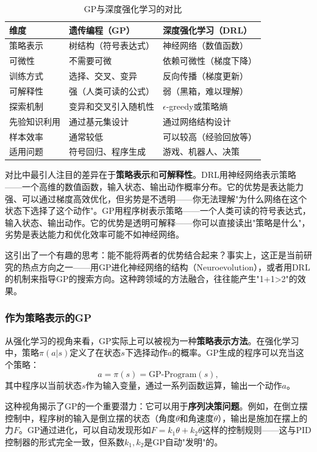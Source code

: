 \documentclass[lang=cn,zihao=-4,a4paper,fontset=windows]{beautybook}
\begin{document}
\begin{table}[H]
\centering
\caption{GP与深度强化学习的对比}
\begin{tabular}{p{}p{}p{}}
\toprule
\textbf{维度} & \textbf{遗传编程（GP）} & \textbf{深度强化学习（DRL）} \\
\midrule
策略表示 & 树结构（符号表达式） & 神经网络（数值函数） \\
\hline
可微性 & 不需要可微 & 依赖可微性（梯度下降） \\
\hline
训练方式 & 选择、交叉、变异 & 反向传播（梯度更新） \\
\hline
可解释性 & 强（人类可读的公式） & 弱（黑箱，难以理解） \\
\hline
探索机制 & 变异和交叉引入随机性 & $\epsilon$-greedy或策略熵 \\
\hline
先验知识利用 & 通过基元集设计 & 通过网络结构设计 \\
\hline
样本效率 & 通常较低 & 可以较高（经验回放等） \\
\hline
适用问题 & 符号回归、程序生成 & 游戏、机器人、决策 \\
\bottomrule
\end{tabular}
\end{table}

对比中最引人注目的差异在于\textbf{策略表示}和\textbf{可解释性}。DRL用神经网络表示策略——一个高维的数值函数，输入状态、输出动作概率分布。它的优势是表达能力强、可以通过梯度高效优化，但劣势是不透明——你无法理解"为什么网络在这个状态下选择了这个动作"。GP用程序树表示策略——一个人类可读的符号表达式，输入状态、输出动作。它的优势是透明可解释——你可以直接读出"策略是什么"，劣势是表达能力和优化效率可能不如神经网络。

这引出了一个有趣的思考：能不能将两者的优势结合起来？事实上，这正是当前研究的热点方向之一——用GP进化神经网络的结构（Neuroevolution），或者用DRL的机制来指导GP的搜索方向。这种跨领域的方法融合，往往能产生"1+1>2"的效果。

\subsubsection{作为策略表示的GP}

从强化学习的视角来看，GP实际上可以被视为一种\textbf{策略表示方法}。在强化学习中，策略$\pi(a|s)$定义了在状态$s$下选择动作$a$的概率。GP生成的程序可以充当这个策略：
\[
a = \pi(s) = \text{GP-Program}(s),
\]
其中程序以当前状态$s$作为输入变量，通过一系列函数运算，输出一个动作$a$。

这种视角揭示了GP的一个重要潜力：它可以用于\textbf{序列决策问题}。例如，在倒立摆控制中，程序树的输入是倒立摆的状态（角度$\theta$和角速度$\dot{\theta}$），输出是施加在摆上的力$F$。GP通过进化，可以自动发现形如$F = k_1 \theta + k_2 \dot{\theta}$这样的控制规则——这与PID控制器的形式完全一致，但系数$k_1, k_2$是GP自动"发明"的。
\end{document}
